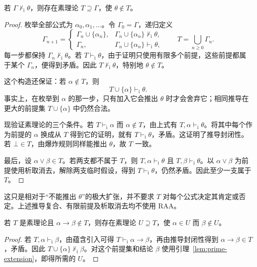 \documentclass[lang=cn,a4paper,fontset=none,zihao=false,10pt,openany,twoside]{beautybook}
\numberwithin{algorithm}{chapter}
\begin{document}
\begin{readingmaterial}[title={阅读材料：Kripke 语义},title after break={阅读材料：Kripke 语义（续）}]
\begin{lemma}[保持不可推导的素理论扩张]\label{lem:prime-extension}
若 $\Gamma\nvdash_{\mathrm i}\theta$，则存在素理论 $T\supseteq\Gamma$，使 $\theta\notin T$。
\end{lemma}
\begin{proof}
枚举全部公式为 $\alpha_0,\alpha_1,\ldots$。令 $\Gamma_0=\Gamma$，递归定义
\[
 \Gamma_{n+1}=\begin{cases}
 \Gamma_n\cup\{\alpha_n\},&\Gamma_n\cup\{\alpha_n\}\nvdash_{\mathrm i}\theta,\\
 \Gamma_n,&\Gamma_n\cup\{\alpha_n\}\vdash_{\mathrm i}\theta,
 \end{cases}
 \qquad T=\bigcup_{n\geq0}\Gamma_n.
\]
每一步都保持 $\Gamma_n\nvdash_{\mathrm i}\theta$。若 $T\vdash_{\mathrm i}\theta$，由于证明只使用有限多个前提，这些前提都属于某个 $\Gamma_n$，便得到矛盾。因此 $T\nvdash_{\mathrm i}\theta$，特别地 $\theta\notin T$。

这个构造还保证：若 $\alpha\notin T$，则
\[
 T\cup\{\alpha\}\vdash_{\mathrm i}\theta.
\]
事实上，在枚举到 $\alpha$ 的那一步，只有加入它会推出 $\theta$ 时才会舍弃它；相同推导在更大的前提集 $T\cup\{\alpha\}$ 中仍然合法。

现验证素理论的三个条件。若 $T\vdash_{\mathrm i}\alpha$ 而 $\alpha\notin T$，由上式有 $T,\alpha\vdash_{\mathrm i}\theta$。将其中每个作为前提的 $\alpha$ 换成从 $T$ 得到它的证明，就有 $T\vdash_{\mathrm i}\theta$，矛盾。这证明了推导封闭性。若 $\bot\in T$，由爆炸规则同样能推出 $\theta$，故 $T$ 一致。

最后，设 $\alpha\vee\beta\in T$。若两支都不属于 $T$，则 $T,\alpha\vdash_{\mathrm i}\theta$ 且 $T,\beta\vdash_{\mathrm i}\theta$。以 $\alpha\vee\beta$ 为前提使用析取消去，解除两支临时假设，得到 $T\vdash_{\mathrm i}\theta$，仍然矛盾。因此至少一支属于 $T$。
\end{proof}
这只是相对于“不能推出 $\theta$”的极大扩张，并不要求 $T$ 对每个公式决定其肯定或否定。上述推导复合、有限前提及析取消去均不使用 RAA。

\begin{lemma}[蕴含的后继见证]\label{lem:kripke-successor}
若 $T$ 是素理论且 $\alpha\to\beta\notin T$，则存在素理论 $U\supseteq T$，使 $\alpha\in U$ 而 $\beta\notin U$。
\end{lemma}
\begin{proof}
若 $T,\alpha\vdash_{\mathrm i}\beta$，由蕴含引入可得 $T\vdash_{\mathrm i}\alpha\to\beta$，再由推导封闭性得到 $\alpha\to\beta\in T$，矛盾。因此 $T\cup\{\alpha\}\nvdash_{\mathrm i}\beta$。对这个前提集和结论 $\beta$ 使用引理~\ref{lem:prime-extension}，即得所需的 $U$。
\end{proof}


\end{readingmaterial}
\end{document}
